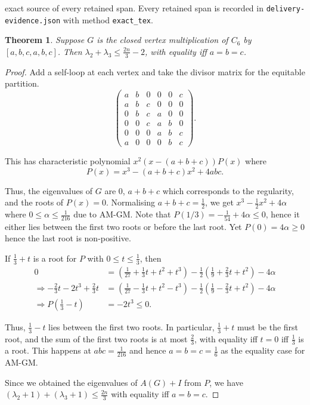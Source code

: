 \documentclass[10pt,a4paper]{amsart}
\theoremstyle{plain}
\newtheorem{thm}{Theorem}
\begin{document}
exact source of every retained span. Every retained span is recorded in \texttt{delivery-evidence.json} with method \texttt{exact\_tex}.
\begin{thm}\label{thm:block}
    Suppose $G$ is the closed vertex multiplication of $C_6$ by $[a, b, c, a, b, c]$. Then $\lambda_2 + \lambda_3 \le \frac{2n}{3} - 2$, with equality iff $a = b = c$. 
\end{thm}

\begin{proof}
    Add a self-loop at each vertex and take the divisor matrix for the equitable partition. 
    \[\begin{pmatrix}
        a & b & 0 & 0 & 0 & c \\
        a & b & c & 0 & 0 & 0 \\
        0 & b & c & a & 0 & 0 \\
        0 & 0 & c & a & b & 0 \\
        0 & 0 & 0 & a & b & c \\
        a & 0 & 0 & 0 & b & c
    \end{pmatrix}.\]
    
    This has characteristic polynomial $x^2(x-(a+b+c))P(x)$ where
    \[P(x) = x^3 - (a+b+c)x^2 + 4abc.\]
    
    Thus, the eigenvalues of $G$ are 0, $a+b+c$ which corresponds to the regularity, and the roots of $P(x) = 0$. Normalising $a + b + c = \frac12$, we get $x^3 - \frac12 x^2 + 4\alpha$ where $0 \le \alpha \le \frac1{216}$ due to AM-GM. Note that $P(1/3) = -\frac1{54} + 4\alpha \le 0$, hence it either lies between the first two roots or before the last root. Yet $P(0) = 4\alpha \ge 0$ hence the last root is non-positive. 

    If $\frac13 + t$ is a root for $P$ with $0 \le t \le \frac13$, then
    \begin{align*}
        0 &= \left(\frac{1}{27} + \frac13 t + t^2 + t^3\right) - \frac12 \left(\frac19 + \frac23 t + t^2\right) - 4\alpha \\ 
        \Rightarrow -\frac23 t - 2t^3 + \frac23 t &= \left(\frac{1}{27} - \frac13 t + t^2 - t^3\right) - \frac12 \left(\frac19 - \frac23 t + t^2\right) - 4\alpha \\
        \Rightarrow P\left(\frac13 - t\right) &= -2t^3 \le 0.
    \end{align*}
    
    Thus, $\frac13 - t$ lies between the first two roots. In particular, $\frac13 + t$ must be the first root, and the sum of the first two roots is at most $\frac23$, with equality iff $t = 0$ iff $\frac13$ is a root. This happens at $abc = \frac1{216}$ and hence $a = b = c = \frac16$ as the equality case for AM-GM. 

    Since we obtained the eigenvalues of $A(G) + I$ from $P$, we have $(\lambda_2 + 1) + (\lambda_3 + 1) \le \frac{2n}{3}$ with equality iff $a = b = c$. 
\end{proof}
\end{document}
